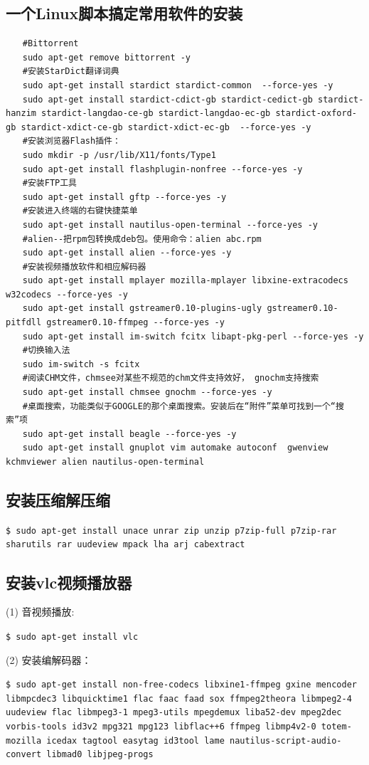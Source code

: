 \subsection{一个Linux脚本搞定常用软件的安装}
\begin{verbatim}
　　#Bittorrent
　　sudo apt-get remove bittorrent -y
　　#安装StarDict翻译词典
　　sudo apt-get install stardict stardict-common  --force-yes -y
　　sudo apt-get install stardict-cdict-gb stardict-cedict-gb stardict-hanzim stardict-langdao-ce-gb stardict-langdao-ec-gb stardict-oxford-gb stardict-xdict-ce-gb stardict-xdict-ec-gb  --force-yes -y
　　#安装浏览器Flash插件：
　　sudo mkdir -p /usr/lib/X11/fonts/Type1
　　sudo apt-get install flashplugin-nonfree --force-yes -y
　　#安装FTP工具
　　sudo apt-get install gftp --force-yes -y
　　#安装进入终端的右键快捷菜单
　　sudo apt-get install nautilus-open-terminal --force-yes -y
　　#alien--把rpm包转换成deb包。使用命令：alien abc.rpm
　　sudo apt-get install alien --force-yes -y
　　#安装视频播放软件和相应解码器
　　sudo apt-get install mplayer mozilla-mplayer libxine-extracodecs w32codecs --force-yes -y
　　sudo apt-get install gstreamer0.10-plugins-ugly gstreamer0.10-pitfdll gstreamer0.10-ffmpeg --force-yes -y
　　sudo apt-get install im-switch fcitx libapt-pkg-perl --force-yes -y
　　#切换输入法
　　sudo im-switch -s fcitx
　　#阅读CHM文件，chmsee对某些不规范的chm文件支持效好， gnochm支持搜索
　　sudo apt-get install chmsee gnochm --force-yes -y
　　#桌面搜索，功能类似于GOOGLE的那个桌面搜索。安装后在“附件”菜单可找到一个“搜索”项
　　sudo apt-get install beagle --force-yes -y
　　sudo apt-get install gnuplot vim automake autoconf  gwenview kchmviewer alien nautilus-open-terminal
\end{verbatim}

\subsection{安装压缩解压缩}
\verb"$ sudo apt-get install unace unrar zip unzip p7zip-full p7zip-rar sharutils rar uudeview mpack lha arj cabextract"

\subsection{安装vlc视频播放器}
(1) 音视频播放:

\verb"$ sudo apt-get install vlc"

(2) 安装编解码器：

\verb"$ sudo apt-get install non-free-codecs libxine1-ffmpeg gxine mencoder libmpcdec3 libquicktime1 flac faac faad sox ffmpeg2theora libmpeg2-4 uudeview flac libmpeg3-1 mpeg3-utils mpegdemux liba52-dev mpeg2dec vorbis-tools id3v2 mpg321 mpg123 libflac++6 ffmpeg libmp4v2-0 totem-mozilla icedax tagtool easytag id3tool lame nautilus-script-audio-convert libmad0 libjpeg-progs"

